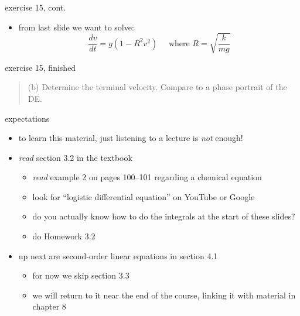 \documentclass[colorlinks]{beamer}
\begin{document}
\begin{frame}{exercise 15, cont.}

\begin{itemize}
\item from last slide we want to solve:
   $$\frac{dv}{dt} = g \left(1 - R^2 v^2\right) \quad \text{ where } R=\sqrt{\frac{k}{mg}}$$
\end{itemize}

\vspace{60mm}
\end{frame}


\begin{frame}{exercise 15, finished}

\begin{quotation}
\noindent (b) Determine the terminal velocity.  Compare to a phase portrait of the DE.
\end{quotation}

\vspace{60mm}
\end{frame}


\begin{frame}{expectations}

\begin{itemize}
\item to learn this material, just listening to a lecture is \emph{not} enough!
\item \emph{read} section 3.2 in the textbook
    \begin{itemize}
    \item \emph{read} example 2 on pages 100--101 regarding a chemical equation
    \item look for ``logistic differential equation'' on YouTube or Google
    \item do you actually know how to do the integrals at the start of these slides?
    \item do Homework 3.2
    \end{itemize}
\item up next are second-order linear equations in section 4.1
    \begin{itemize}
    \item for now we skip section 3.3
    \item we will return to it near the end of the course, linking it with material in chapter 8
    \end{itemize}
\end{itemize}
\end{frame}
\end{document}
